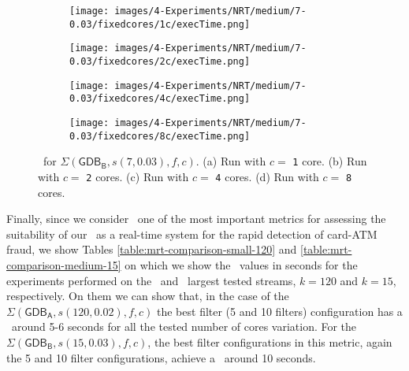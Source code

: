 \begin{figure}[H]
    \centering
    \hspace*{-1.7cm} %
    \begin{subfigure}{0.5\textwidth}
        \centering
        \texttt{[image: images/4-Experiments/NRT/medium/7-0.03/fixedcores/1c/execTime.png]}
        \caption{}
        \label{fig:exps-medium-7-mrt-1c}
    \end{subfigure}
    \hspace*{1cm} 
    \begin{subfigure}{0.5\textwidth}
        \centering
        \texttt{[image: images/4-Experiments/NRT/medium/7-0.03/fixedcores/2c/execTime.png]}
        \caption{}
        \label{fig:exps-medium-7-mrt-4c}
    \end{subfigure}

    \vspace{0.5cm} %

    \hspace*{-1.7cm} %
    \begin{subfigure}{0.5\textwidth}
        \centering
        \texttt{[image: images/4-Experiments/NRT/medium/7-0.03/fixedcores/4c/execTime.png]}
        \caption{}
        \label{fig:exps-medium-7-mrt-8c}
    \end{subfigure}
    \hspace*{1cm}
    \begin{subfigure}{0.5\textwidth}
        \centering
        \texttt{[image: images/4-Experiments/NRT/medium/7-0.03/fixedcores/8c/execTime.png]}
        \caption{}
        \label{fig:exps-medium-7-mrt-16c}
    \end{subfigure}

    \caption{\ET\ for $\Sigma(\mathsf{GDB_B}, s(7, 0.03), f, c)$. (a) Run with $c=$ \texttt{1} core. (b) Run with $c=$ \texttt{2} cores. (c) Run with $c=$ \texttt{4} cores. (d) Run with $c=$ \texttt{8} cores.}
    \label{img:exps-medium-7-et}
\end{figure}

Finally, since we consider \MRT\ one of the most important metrics for assessing the suitability of our \DPATM\ as a real-time system for the rapid detection of card-ATM fraud, we show Tables \ref{table:mrt-comparison-small-120} and \ref{table:mrt-comparison-medium-15} on which we show the \MRT\ values in seconds for the experiments performed on the \smallG\ and \mediumG\ largest tested streams, $k=120$ and $k=15$, respectively. On them we can show that, in the case of the $\Sigma(\mathsf{GDB_A}, s(120, 0.02), f, c)$ the best filter (5 and 10 filters) configuration has a \MRT\ around 5-6 seconds for all the tested number of cores variation. For the $\Sigma(\mathsf{GDB_B}, s(15, 0.03), f, c)$, the best filter configurations in this metric, again the 5 and 10 filter configurations, achieve a \MRT\ around 10 seconds.

